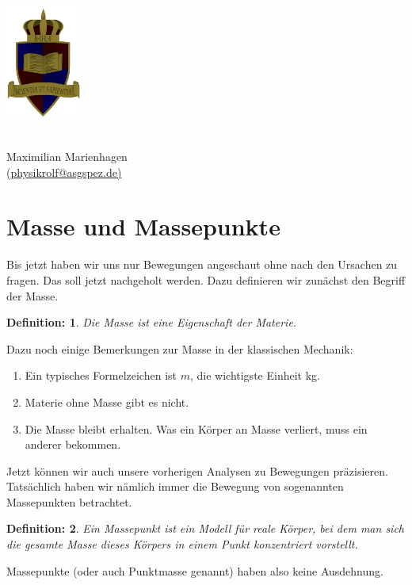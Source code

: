 \documentclass[a4paper, twocolumn, 9pt]{article}
\newtheorem*{definition}{Definition:}
\begin{document}
\vspace*{-2cm}
\parbox{2cm}{\includegraphics[width=2.5cm]{../task/images/ROLF4.png}}
\parbox{5.3cm}{ \\ Maximilian Marienhagen\\ \vspace*{-0.5cm} (\href{mailto:physikrolf@asgspez.de}{physikrolf@asgspez.de)}}
\section*{Masse und Massepunkte}
Bis jetzt haben wir uns nur Bewegungen angeschaut ohne nach den Ursachen zu fragen. Das soll jetzt nachgeholt werden. Dazu definieren wir zunächst den Begriff der Masse.
\begin{definition}
Die Masse ist eine Eigenschaft der Materie.
\end{definition}
Dazu noch einige Bemerkungen zur Masse in der klassischen Mechanik:
\begin{enumerate}
    \item Ein typisches Formelzeichen ist $m$, die wichtigste Einheit kg.
    \item Materie ohne Masse gibt es nicht.
    \item Die Masse bleibt erhalten. Was ein Körper an Masse verliert, muss ein anderer bekommen.
\end{enumerate}
Jetzt können wir auch unsere vorherigen Analysen zu Bewegungen präzisieren. Tatsächlich haben wir nämlich immer die Bewegung von sogenannten Massepunkten betrachtet.
\begin{definition}
Ein Massepunkt ist ein Modell für reale Körper, bei dem man sich die gesamte Masse dieses Körpers in einem Punkt konzentriert vorstellt.
\end{definition}
Massepunkte (oder auch Punktmasse genannt) haben also keine Ausdehnung.
\end{document}

